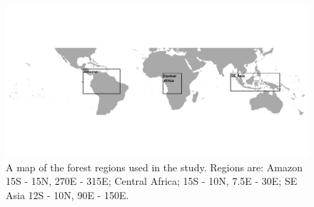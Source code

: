 \documentclass[gmd, manuscript]{copernicus} %
\begin{document}



\begin{figure}[t]
\includegraphics[width=12cm]{../graphics/map_forests_augmented.pdf}
\caption{A map of the forest regions used in the study. Regions are: Amazon 15\textdegree S - 15\textdegree N, 270\textdegree E - 315\textdegree E; Central Africa; 15\textdegree S - 10\textdegree N, 7.5\textdegree E - 30\textdegree E; SE Asia 12\textdegree S - 10\textdegree N, 90\textdegree E - 150\textdegree E.}
\label{fig:map_forests}
\end{figure}
\end{document}
